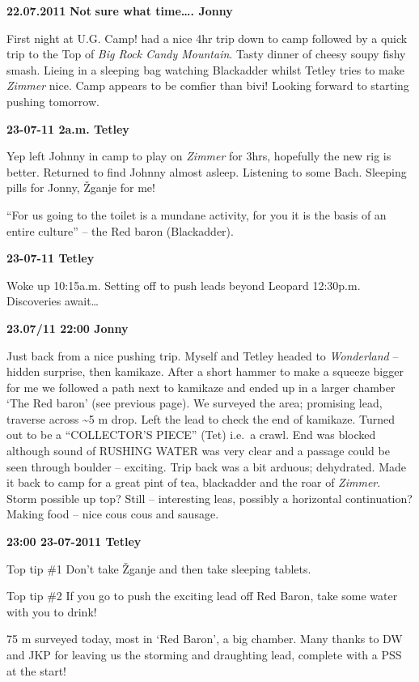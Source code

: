 \textbf{22.07.2011} \textbf{Not} \textbf{sure what time\ldots{}. Jonny}

First night at U.G. Camp! had a nice 4hr trip down to camp followed by a
quick trip to the Top of \emph{Big Rock Candy Mountain}. Tasty dinner of
cheesy soupy fishy smash. Lieing in a sleeping bag watching Blackadder
whilst Tetley tries to make \emph{Zimmer} nice. Camp appears to be
comfier than bivi! Looking forward to starting pushing tomorrow.

\textbf{23-07-11 2a.m. Tetley}

Yep left Johnny in camp to play on \emph{Zimmer} for 3hrs, hopefully the
new rig is better. Returned to find Johnny almost asleep. Listening to
some Bach. Sleeping pills for Jonny, Žganje for me!

``For us going to the toilet is a mundane activity, for you it is the
basis of an entire culture'' -- the Red baron (Blackadder).

\textbf{23-07-11 Tetley}

Woke up 10:15a.m. Setting off to push leads beyond Leopard 12:30p.m.
Discoveries await\ldots{}

\textbf{23.07/11 22:00 Jonny}

Just back from a nice pushing trip. Myself and Tetley headed to
\emph{Wonderland} -- hidden surprise, then kamikaze. After a short
hammer to make a squeeze bigger for me we followed a path next to
kamikaze and ended up in a larger chamber `The Red baron' (see previous
page). We surveyed the area; promising lead, traverse across
\textasciitilde 5 m drop. Left the lead to check the end of kamikaze.
Turned out to be a ``COLLECTOR'S PIECE'' (Tet) i.e.~a crawl. End was
blocked although sound of RUSHING WATER was very clear and a passage
could be seen through boulder -- exciting. Trip back was a bit arduous;
dehydrated. Made it back to camp for a great pint of tea, blackadder and
the roar of \emph{Zimmer}. Storm possible up top? Still -- interesting
leas, possibly a horizontal continuation? Making food -- nice cous cous
and sausage.

\textbf{23:00 23-07-2011 Tetley}

Top tip \#1 Don't take Žganje and then take sleeping tablets.

Top tip \#2 If you go to push the exciting lead off Red Baron, take some
water with you to drink!

75 m surveyed today, most in `Red Baron', a big chamber. Many thanks to
DW and JKP for leaving us the storming and draughting lead, complete
with a PSS at the start!

